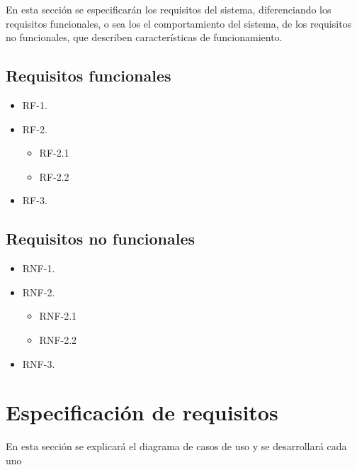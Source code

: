 En esta sección se especificarán los requisitos del sistema, diferenciando los requisitos funcionales, o sea los  el comportamiento del sistema, de los requisitos no funcionales, que describen características de funcionamiento.
\subsection{Requisitos funcionales}\label{r-funcionales}
\begin{itemize}
    \item RF-1.
    \item RF-2.
    \begin{itemize}
         \item RF-2.1
         \item RF-2.2
    \end{itemize}
    \item RF-3.
\end{itemize}

\subsection{Requisitos no funcionales}\label{rnofuncionales}
\begin{itemize}
    \item RNF-1.
    \item RNF-2.
    \begin{itemize}
              \item RNF-2.1
        	   \item RNF-2.2
    \end{itemize}
    \item RNF-3.
\end{itemize}


\section{Especificación de requisitos}\label{eequisitos}

En esta sección se explicará el diagrama de casos de uso y se desarrollará cada uno





